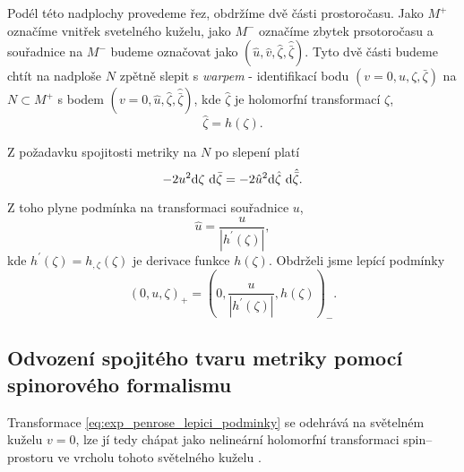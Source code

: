 Podél této nadplochy provedeme řez, obdržíme dvě části prostoročasu. Jako $M^+$ označíme vnitřek
svetelného kuželu, jako $M^-$ označíme zbytek prsotoročasu a souřadnice na $M^-$ budeme označovat jako $(\hat{u}, \hat{v}, \hat{\zeta}, \hat{\bar{\zeta}})$.
Tyto dvě části budeme chtít na nadploše $N$ zpětně slepit s \emph{warpem} - identifikací bodu $(v=0, u, \zeta, \bar{\zeta})$ na $N \subset M^+$
s bodem $(v = 0, \hat{u}, \hat{\zeta}, \hat{\bar{\zeta}})$, kde $\hat{\zeta}$ je holomorfní transformací $\zeta$,
\begin{equation}
    \label{eq:zeta_holomorfni_h}
    \hat{\zeta} = h(\zeta).
\end{equation}

Z požadavku spojitosti metriky na $N$ po slepení platí
\begin{equation}
    -2 u^2 \mathrm{d} \zeta ~ \mathrm{d} \bar{\zeta} = -2 \hat{u}^2 \mathrm{d} \hat{\zeta} ~ \mathrm{d} \hat{\bar{\zeta}}.
\end{equation}

Z toho plyne podmínka na transformaci souřadnice $u$,
\begin{equation}
    \label{eq:u_podminka_spojitosti}
    \hat{u} = \frac{u}{\left| h^{'}(\zeta) \right|},
\end{equation}
kde $h^{'}(\zeta) = h_{,\zeta}(\zeta)$ je derivace funkce $h(\zeta)$.
Obdrželi jsme lepící podmínky
\begin{equation}
    \label{eq:exp_penrose_lepici_podminky}
    (0, u, \zeta)_+ = \left(0, \frac{u}{\left| h^{'}(\zeta)\right|}, h(\zeta)\right)_{-}.
\end{equation}

\subsection{Odvození spojitého tvaru metriky pomocí spinorového formalismu}

Transformace \eqref{eq:exp_penrose_lepici_podminky} se odehrává na světelném kuželu
$v=0$, lze jí tedy chápat jako nelineární holomorfní transformaci spin--prostoru ve vrcholu
tohoto světelného kuželu \cite{PenroseNutku1992}.

